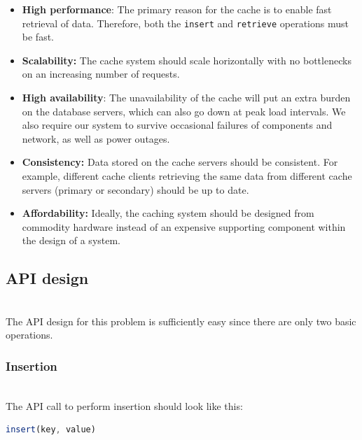 \begin{itemize}
\item
\protect{}\label{0g8UkxyDuXHnGOLwgsM_D}
\textbf{High performance}: The primary reason for the cache is to enable fast retrieval of data. Therefore, both the \texttt{insert} and \texttt{retrieve} operations must be fast.
\item
\protect{}\label{1kXHUfgyLFhLz2bktb9dg}
\textbf{Scalability:} The cache system should scale horizontally with no bottlenecks on an increasing number of requests.
\item
\protect{}\label{IELRkO7oeLqKU9stf8gnU}
\textbf{High availability}: The unavailability of the cache will put an extra burden on the database servers, which can also go down at peak load intervals. We also require our system to survive occasional failures of components and network, as well as power outages.
\item
\protect{}\label{0SqpxWahCzer30DFiWwTR}
\textbf{Consistency:} Data stored on the cache servers should be consistent. For example, different cache clients retrieving the same data from different cache servers (primary or secondary) should be up to date.
\item
\protect{}\label{nvI_V1IRk8pN4zyY6AOu_}
\textbf{Affordability:} Ideally, the caching system should be designed from commodity hardware instead of an expensive supporting component within the design of a system.
\end{itemize}

\subsection{API design}\label{9xj--dRijmEBp8cJ54_6f}
\\
The API design for this problem is sufficiently easy since there are only two basic operations.

\subsubsection{Insertion}\label{qrluScoAPjJDMhBBBmm4a}
\\
The API call to perform insertion should look like this:

\begin{lstlisting}[language=JavaScript]
insert(key, value)
\end{lstlisting}

\begin{table}[htbp]
\centering
\small
{}
\end{table}

